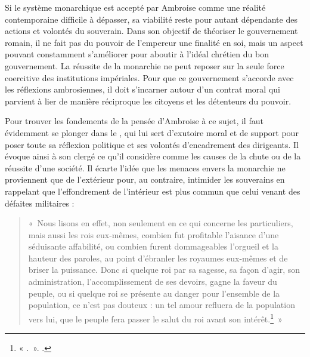 Si le système monarchique est accepté par Ambroise comme une réalité contemporaine difficile à dépasser, sa viabilité reste pour autant dépendante des actions et volontés du souverain. Dans son objectif de théoriser le gouvernement romain, il ne fait pas du pouvoir de l'empereur une finalité en soi, mais un aspect pouvant constamment s'améliorer pour aboutir à l'idéal chrétien du bon gouvernement. La réussite de la monarchie ne peut reposer sur la seule force coercitive des institutions impériales. Pour que ce gouvernement s'accorde avec les réflexions ambrosiennes, il doit s'incarner autour d'un contrat moral qui parvient à lier de manière réciproque les citoyens et les détenteurs du pouvoir.

\bigskip

Pour trouver les fondements de la pensée d'Ambroise à ce sujet, il faut évidemment se plonger dans le , qui lui sert d'exutoire moral et de support pour poser toute sa réflexion politique et ses volontés d'encadrement des dirigeants. Il évoque ainsi à son clergé ce qu'il considère comme les causes de la chute ou de la réussite d'une société. Il écarte l'idée que les menaces envers la monarchie ne proviennent que de l'extérieur pour, au contraire, intimider les souverains en rappelant que l'effondrement de l'intérieur est plus commun que celui venant des défaites militaires :

\bigskip

\begin{quote}
    «~Nous lisons en effet, non seulement en ce qui concerne les particuliers, mais aussi les rois eux-mêmes, combien fut profitable l’aisance d’une séduisante affabilité, ou combien furent dommageables l'orgueil et la hauteur des paroles, au point d’ébranler les royaumes eux-mêmes et de briser la puissance. Donc si quelque roi par sa sagesse, sa façon d’agir, son administration, l’accomplissement de ses devoirs, gagne la faveur du peuple, ou si quelque roi se présente au danger pour l’ensemble de la population, ce n’est pas douteux : un tel amour refluera de la population vers lui, que le peuple fera passer le salut du roi avant son intérêt.\footnote{« .~». \cite[\nopp II, 30]{ambroise_devoirs_2}.}~»
\end{quote}

